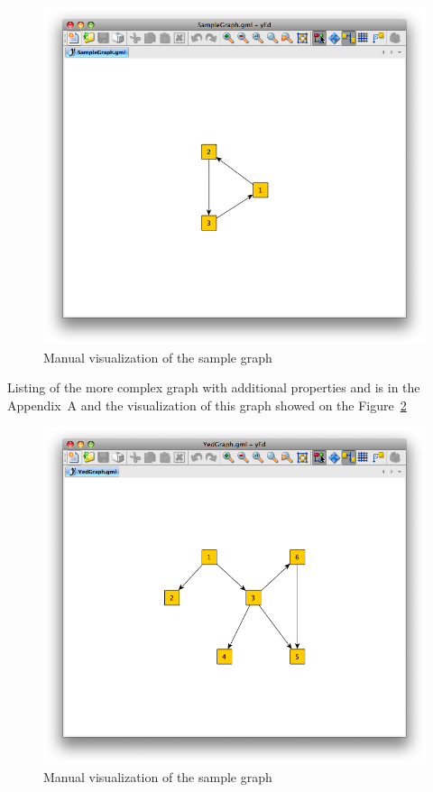 \begin{figure}[h!]
\centering
\includegraphics[scale=0.5]{pictures/SampleGraph.png}
\caption{Manual visualization of the sample graph}
\label{fig:sample_graph_yed_vis}
\end{figure}

Listing of the more complex graph with additional properties and is in the Appendix~A and the visualization of this graph showed on the Figure~\ref{fig:yed_graph_vis}

\begin{figure}[h!]
\centering
\includegraphics[scale=0.5]{pictures/YedGraph.png}
\caption{Manual visualization of the sample graph}
\label{fig:yed_graph_vis}
\end{figure}

